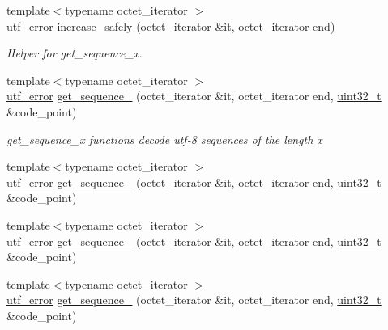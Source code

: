 \begin{DoxyCompactItemize}
\item 
{\footnotesize template$<$typename octet\+\_\+iterator $>$ }\\\hyperlink{namespaceutf8_1_1internal_a9e96c2bc98b37e336b787a281090392c}{utf\+\_\+error} \hyperlink{namespaceutf8_1_1internal_a369641e705a3d7c91eb160868a6705f7}{increase\+\_\+safely} (octet\+\_\+iterator \&it, octet\+\_\+iterator end)
\begin{DoxyCompactList}\small\item\em Helper for get\+\_\+sequence\+\_\+x. \end{DoxyCompactList}\item 
{\footnotesize template$<$typename octet\+\_\+iterator $>$ }\\\hyperlink{namespaceutf8_1_1internal_a9e96c2bc98b37e336b787a281090392c}{utf\+\_\+error} \hyperlink{namespaceutf8_1_1internal_a6e5df73716136aec55e8fcf3309038b6}{get\+\_\+sequence\+\_} (octet\+\_\+iterator \&it, octet\+\_\+iterator end, \hyperlink{namespaceutf8_a846259d2f173d524282583fc9d825b00}{uint32\+\_\+t} \&code\+\_\+point)
\begin{DoxyCompactList}\small\item\em get\+\_\+sequence\+\_\+x functions decode utf-\/8 sequences of the length x \end{DoxyCompactList}\item 
{\footnotesize template$<$typename octet\+\_\+iterator $>$ }\\\hyperlink{namespaceutf8_1_1internal_a9e96c2bc98b37e336b787a281090392c}{utf\+\_\+error} \hyperlink{namespaceutf8_1_1internal_a9d641b9546be985f9f0fd4955ac42a24}{get\+\_\+sequence\+\_} (octet\+\_\+iterator \&it, octet\+\_\+iterator end, \hyperlink{namespaceutf8_a846259d2f173d524282583fc9d825b00}{uint32\+\_\+t} \&code\+\_\+point)
\item 
{\footnotesize template$<$typename octet\+\_\+iterator $>$ }\\\hyperlink{namespaceutf8_1_1internal_a9e96c2bc98b37e336b787a281090392c}{utf\+\_\+error} \hyperlink{namespaceutf8_1_1internal_ac1809a1fb3fa6983d64a0d3a39646008}{get\+\_\+sequence\+\_} (octet\+\_\+iterator \&it, octet\+\_\+iterator end, \hyperlink{namespaceutf8_a846259d2f173d524282583fc9d825b00}{uint32\+\_\+t} \&code\+\_\+point)
\item 
{\footnotesize template$<$typename octet\+\_\+iterator $>$ }\\\hyperlink{namespaceutf8_1_1internal_a9e96c2bc98b37e336b787a281090392c}{utf\+\_\+error} \hyperlink{namespaceutf8_1_1internal_ad1958e7c6746ba6b1fbb0d81b88b346c}{get\+\_\+sequence\+\_} (octet\+\_\+iterator \&it, octet\+\_\+iterator end, \hyperlink{namespaceutf8_a846259d2f173d524282583fc9d825b00}{uint32\+\_\+t} \&code\+\_\+point)

\end{DoxyCompactItemize}
